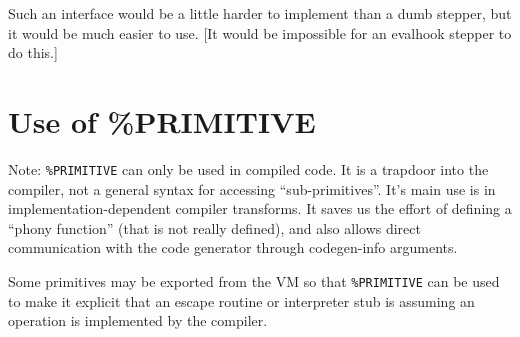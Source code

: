 Such an interface would be a little harder to implement than a dumb stepper,
but it would be much easier to use.  [It would be impossible for an evalhook
stepper to do this.]


\section{Use of \%PRIMITIVE}

Note: \verb|%PRIMITIVE| can only be used in compiled code. It is a
trapdoor into the compiler, not a general syntax for accessing
``sub-primitives''. It's main use is in implementation-dependent
compiler transforms. It saves us the effort of defining a ``phony
function'' (that is not really defined), and also allows direct
communication with the code generator through codegen-info arguments.

Some primitives may be exported from the VM so that \verb|%PRIMITIVE|
can be used to make it explicit that an escape routine or interpreter
stub is assuming an operation is implemented by the compiler.
